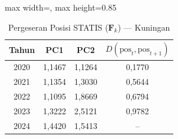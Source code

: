 \begin{table}[H]
\centering
\caption{Pergeseran Posisi STATIS ($\mathbf{F}_k$) --- Kuningan} \label{tab:app2jarak_statis_skor_kuningan}
\begin{adjustbox}{max width=\textwidth, max height=0.85\textheight}
\begin{tabular}{|c|c|c|c|}
\hline
\textbf{Tahun} & \textbf{PC1} & \textbf{PC2} & \textbf{$D(\text{pos}_t, \text{pos}_{t+1})$} \\
\hline
2020 & 1,1467 & 1,1264 & 0,1770 \\
2021 & 1,1354 & 1,3030 & 0,5644 \\
2022 & 1,1095 & 1,8669 & 0,6794 \\
2023 & 1,3222 & 2,5121 & 0,9782 \\
2024 & 1,4420 & 1,5413 & -- \\
\hline
\end{tabular}
\end{adjustbox}
\end{table}
